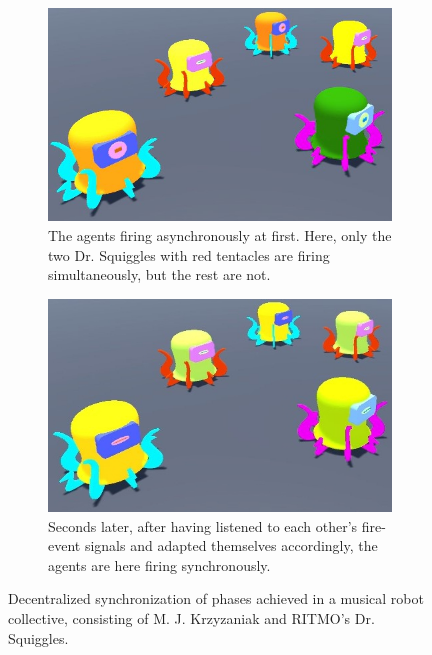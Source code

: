 	\begin{figure}[h]
		\centering
			\begin{subfigure}[t]{.5\textwidth}
				\centering\captionsetup{width=.9\linewidth}%
				\includegraphics[width=0.9\linewidth]{Assets/Figures/IntroUnsynch.jpg}
				\caption{The agents firing asynchronously at first. Here, only the two Dr. Squiggles with red tentacles are firing simultaneously, but the rest are not.}
				\label{fig:initial:unsynch}
			\end{subfigure}%
			\begin{subfigure}[t]{.5\textwidth}
				\centering\captionsetup{width=.9\linewidth}%
				\includegraphics[width=0.9\linewidth]{Assets/Figures/IntroSynch.jpg}
				\caption{Seconds later, after having listened to each other's fire-event signals and adapted themselves accordingly, the agents are here firing synchronously.}
				\label{fig:initial:synch}
			\end{subfigure}
		\caption{Decentralized synchronization of phases achieved in a musical robot collective, consisting of M. J. Krzyzaniak and RITMO's Dr. Squiggles.}
		\label{fig:initial}
	\end{figure}

